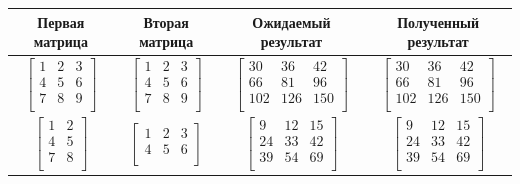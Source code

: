 \documentclass[12pt]{report}
\begin{document}
	\begin{table}[h]
		\label{tabular:functional_test}
		\begin{center}
			\begin{tabular}{ | c | c | c | c |}
				\hline
				\textbf{Первая матрица} & \textbf{Вторая матрица} & \textbf{Ожидаемый результат} & \textbf{Полученный результат}\\ \hline
				$\begin{bmatrix} 
					1&2&3 \\
					4&5&6 \\ 
					7&8&9 \\ 
				\end{bmatrix}$ & 
				$\begin{bmatrix} 
					1&2&3 \\
					4&5&6 \\ 
					7&8&9 \\ 
				\end{bmatrix}$ &
				$\begin{bmatrix} 
					30&36&42 \\
					66&81&96 \\ 
					102&126&150 \\ 
				\end{bmatrix}$ &
				$\begin{bmatrix} 
					30&36&42 \\
					66&81&96 \\ 
					102&126&150 \\ 
				\end{bmatrix} $\\ 
				\hline
				
				$\begin{bmatrix} 
					1&2 \\
					4&5 \\ 
					7&8 \\ 
				\end{bmatrix}$ & 
				$\begin{bmatrix} 
					1&2&3 \\
					4&5&6 \\ 
				\end{bmatrix}$ &
				$\begin{bmatrix} 
					9&12&15 \\
					24&33&42 \\ 
					39&54&69 \\ 
				\end{bmatrix} $ &
				$\begin{bmatrix} 
					9&12&15 \\
					24&33&42 \\ 
					39&54&69 \\ 
				\end{bmatrix} $ \\
				\hline
				

\end{tabular}
\end{center}
\end{table}
\end{document}
